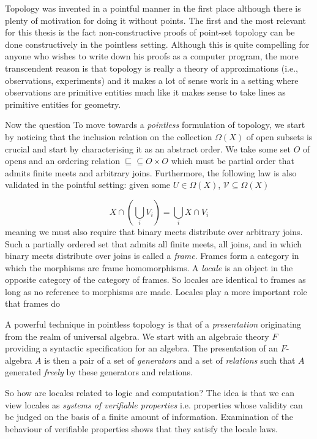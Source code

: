 \documentclass{article}
\begin{document}
Topology was invented in a pointful manner in the first place although there is plenty of
motivation for doing it without points. The first and the most relevant for this thesis is
the fact non-constructive proofs of point-set topology can be done constructively in the
pointless setting. Although this is quite compelling for anyone who wishes to write down
his proofs as a computer program, the more transcendent reason is that topology is really
a theory of approximations (i.e., observations, experiments) and it makes a lot of sense
work in a setting where observations are primitive entities much like it makes sense to
take lines as primitive entities for geometry.

Now the question
To move towards a
\emph{pointless} formulation of topology, we start by noticing that the inclusion relation
on the collection $\Omega(X)$ of open subsets is crucial and start by characterising it as an
abstract order. We take some set $O$ of opens and an ordering relation $\sqsubseteq \subseteq O \times O$ which
must be partial order that admits finite meets and arbitrary joins. Furthermore, the
following law is also validated in the pointful setting: given some $U \in \Omega(X)$,
$\mathcal{V} \subseteq \Omega(X)$

\begin{equation*}
  X \cap (\bigcup_{i} V_i) = \bigcup_{i} X \cap V_i
\end{equation*}
meaning we must also require that binary meets distribute over arbitrary joins. Such a
partially ordered set that admits all finite meets, all joins, and in which binary meets
distribute over joins is called a \emph{frame}. Frames form a category in which the
morphisms are frame homomorphisms. A \emph{locale} is an object in the opposite category
of the category of frames. So locales are identical to frames as long as no reference to
morphisms are made. Locales play a more important role that frames do

A powerful technique in pointless topology is that of a \emph{presentation} originating
from the realm of universal algebra. We start with an algebraic theory $F$ providing a
syntactic specification for an algebra. The presentation of an $F$-algebra $A$ is then a
pair of a set of \emph{generators} and a set of \emph{relations} such that $A$ generated
\emph{freely} by these generators and relations.

So how are locales related to logic and computation? The idea is that we can view locales
as \emph{systems of verifiable properties} i.e. properties whose validity can be judged on
the basis of a finite amount of information. Examination of the behaviour of verifiable
properties shows that they satisfy the locale laws.
\end{document}
